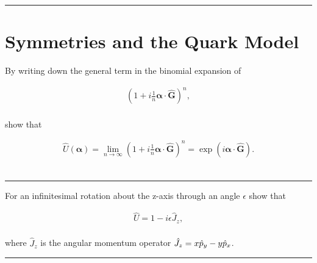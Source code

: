 
\noindent\rule{7in}{2.8pt}
\section{Symmetries and the Quark Model}
    
\begin{problem}{9.1}
By writing down the general term in the binomial expansion of

\begin{align*}
    \left( 1+ i \frac{1}{n} \boldsymbol{\alpha} \cdot \hat{\boldsymbol{G}}\right)^n,
\end{align*}\\
show that

\begin{align*}
    \hat{U}(\boldsymbol{\alpha}) = \lim_{n\to\infty}   \left( 1+ i \frac{1}{n} \boldsymbol{\alpha} \cdot \hat{\boldsymbol{G}}\right)^n = \exp \left( i   \boldsymbol{\alpha} \cdot \hat{\boldsymbol{G}} \right).
\end{align*}\\
\end{problem}
\begin{solution}

\end{solution}

\noindent\rule{7in}{1.5pt}


\begin{problem}{9.2}
    For an infinitesimal rotation about the z-axis through an angle $\epsilon$ show that

    \begin{align*}
        \hat{U} = 1-i\epsilon \hat{J}_z,
    \end{align*}\\
    where $\hat{J}_z$ is the angular momentum operator $\hat{J}_z = x \hat{p}_y - y\hat{p}_x $. 
\end{problem}
\begin{solution}

\end{solution}

\noindent\rule{7in}{1.5pt}


